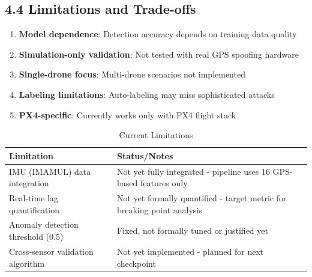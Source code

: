 \subsection{4.4 Limitations and Trade-offs}

\begin{enumerate}
    \item \textbf{Model dependence}: Detection accuracy depends on training data quality
    \item \textbf{Simulation-only validation}: Not tested with real GPS spoofing hardware
    \item \textbf{Single-drone focus}: Multi-drone scenarios not implemented
    \item \textbf{Labeling limitations}: Auto-labeling may miss sophisticated attacks
    \item \textbf{PX4-specific}: Currently works only with PX4 flight stack
\end{enumerate}

\begin{table}[htbp]
    \centering
    \caption{Current Limitations}
    \label{tab:limitations}
    \begin{tabular}{|p{4cm}|p{11cm}|}
        \hline
        \textbf{Limitation} & \textbf{Status/Notes} \\
        \hline
        IMU (IMAMUL) data integration & Not yet fully integrated - pipeline uses 16 GPS-based features only \\
        \hline
        Real-time lag quantification & Not yet formally quantified - target metric for breaking point analysis \\
        \hline
        Anomaly detection threshold (0.5) & Fixed, not formally tuned or justified yet \\
        \hline
        Cross-sensor validation algorithm & Not yet implemented - planned for next checkpoint \\
        \hline
    \end{tabular}
\end{table}
